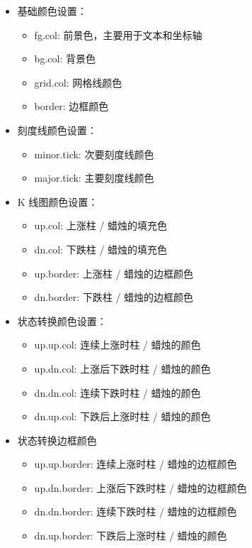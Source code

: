 \documentclass[]{ctexbook}
\providecommand{\tightlist}{%
  \setlength{\itemsep}{0pt}\setlength{\parskip}{0pt}}
\begin{document}
\begin{itemize}
\tightlist
\item
  基础颜色设置：

  \begin{itemize}
  \tightlist
  \item
    fg.col: 前景色，主要用于文本和坐标轴
  \item
    bg.col: 背景色
  \item
    grid.col: 网格线颜色
  \item
    border: 边框颜色
  \end{itemize}
\item
  刻度线颜色设置：

  \begin{itemize}
  \tightlist
  \item
    minor.tick: 次要刻度线颜色
  \item
    major.tick: 主要刻度线颜色
  \end{itemize}
\item
  K 线图颜色设置：

  \begin{itemize}
  \tightlist
  \item
    up.col: 上涨柱 / 蜡烛的填充色
  \item
    dn.col: 下跌柱 / 蜡烛的填充色
  \item
    up.border: 上涨柱 / 蜡烛的边框颜色
  \item
    dn.border: 下跌柱 / 蜡烛的边框颜色
  \end{itemize}
\item
  状态转换颜色设置：

  \begin{itemize}
  \tightlist
  \item
    up.up.col: 连续上涨时柱 / 蜡烛的颜色
  \item
    up.dn.col: 上涨后下跌时柱 / 蜡烛的颜色
  \item
    dn.dn.col: 连续下跌时柱 / 蜡烛的颜色
  \item
    dn.up.col: 下跌后上涨时柱 / 蜡烛的颜色
  \end{itemize}
\item
  状态转换边框颜色

  \begin{itemize}
  \tightlist
  \item
    up.up.border: 连续上涨时柱 / 蜡烛的边框颜色
  \item
    up.dn.border: 上涨后下跌时柱 / 蜡烛的边框颜色
  \item
    dn.dn.border: 连续下跌时柱 / 蜡烛的边框颜色
  \item
    dn.up.border: 下跌后上涨时柱 / 蜡烛的颜色
  \end{itemize}
\end{itemize}
\end{document}
